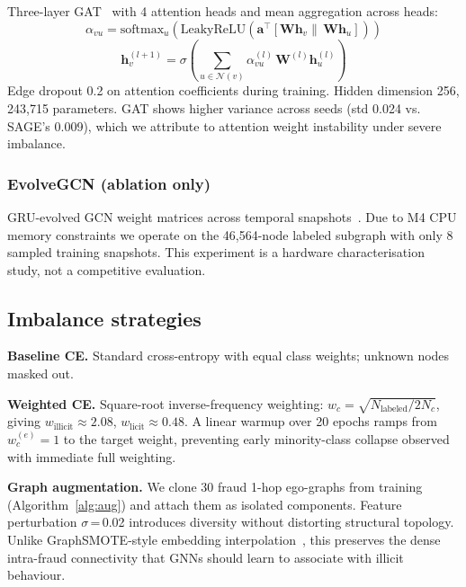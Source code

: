Three-layer GAT~\citep{velickovic2018} with 4 attention heads and mean
aggregation across heads:
\begin{equation}
\alpha_{vu} = \text{softmax}_u\!\left(
  \text{LeakyReLU}\!\left(
    \mathbf{a}^\top\!\left[\mathbf{W}\mathbf{h}_v \|\, \mathbf{W}\mathbf{h}_u\right]
  \right)
\right)
\label{eq:gat}
\end{equation}
\begin{equation}
\mathbf{h}_v^{(l+1)} = \sigma\!\left(
  \sum_{u\in\mathcal{N}(v)} \alpha_{vu}^{(l)}\, \mathbf{W}^{(l)}\mathbf{h}_u^{(l)}
\right)
\label{eq:gat2}
\end{equation}
Edge dropout 0.2 on attention coefficients during training.  Hidden
dimension 256, 243,715 parameters.  GAT shows higher variance across
seeds (std 0.024 vs. SAGE's 0.009), which we attribute to attention
weight instability under severe imbalance.

\subsubsection{EvolveGCN (ablation only)}

GRU-evolved GCN weight matrices across temporal
snapshots~\citep{pareja2020evolvegcn}.  Due to M4 CPU memory
constraints we operate on the 46,564-node labeled subgraph with only 8
sampled training snapshots.  This experiment is a hardware
characterisation study, not a competitive evaluation.

\subsection{Imbalance strategies}

\textbf{Baseline CE.}  Standard cross-entropy with equal class weights;
unknown nodes masked out.

\textbf{Weighted CE.}  Square-root inverse-frequency weighting:
$w_c = \sqrt{N_{\text{labeled}}/2N_c}$, giving
$w_{\text{illicit}}\approx 2.08$, $w_{\text{licit}}\approx 0.48$.
A linear warmup over 20 epochs ramps from $w_c^{(e)}=1$ to the target
weight, preventing early minority-class collapse observed with
immediate full weighting.

\textbf{Graph augmentation.}  We clone 30 fraud 1-hop ego-graphs from
training (Algorithm~\ref{alg:aug}) and attach them as isolated
components.  Feature perturbation $\sigma$\,=\,0.02 introduces
diversity without distorting structural topology.  Unlike
GraphSMOTE-style embedding interpolation~\citep{zhao2021graphsmote},
this preserves the dense intra-fraud connectivity that GNNs should
learn to associate with illicit behaviour.

